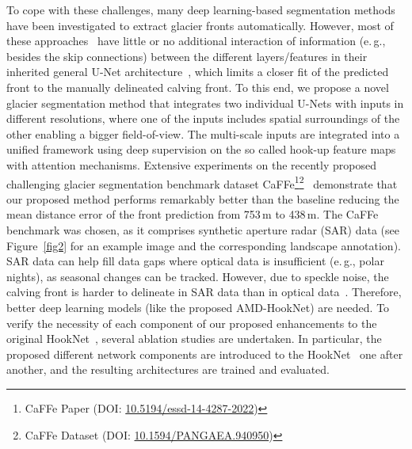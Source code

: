 \documentclass[lettersize,journal,siunitx]{IEEEtran}
\newcommand{\eg}{e.\,g.,\xspace}
\begin{document}
To cope with these challenges, many deep learning-based segmentation methods~\cite{baumhoer2019automated,zhang2019automatically,zhang2021automated,mohajerani2019detection,heidler2021hed,liu2021multiscale,periyasamy2022get,holzmann2021glacier,baumhoer2021environmental,dong2022automatic,marochov2021image,cheng2021calving,essd-14-4287-2022} have been investigated to extract glacier fronts automatically. However, most of these approaches~\cite{baumhoer2019automated,mohajerani2019detection, zhang2019automatically,liu2021multiscale,periyasamy2022get,holzmann2021glacier} have little or no additional interaction of information (\eg besides the skip connections) between the different layers/features in their inherited general U-Net architecture~\cite{ronneberger2015u}, which limits a closer fit of the predicted front to the manually delineated calving front. To this end, we propose a novel glacier segmentation method that integrates two individual U-Nets with inputs in different resolutions, where one of the inputs includes spatial surroundings of the other enabling a bigger field-of-view. The multi-scale inputs are integrated into a unified framework using deep supervision on the so called hook-up feature maps with attention mechanisms. Extensive experiments on the recently proposed challenging glacier segmentation benchmark dataset CaFFe\footnote{CaFFe Paper (DOI: \href{https://essd.copernicus.org/articles/14/4287/2022/}{10.5194/essd-14-4287-2022})}\footnote{CaFFe Dataset (DOI: \href{https://doi.org/10.1594/PANGAEA.940950}{10.1594/PANGAEA.940950})}~\cite{essd-14-4287-2022} demonstrate that our proposed method performs remarkably better than the baseline reducing the mean distance error of the front prediction from 753\,m to 438\,m. The CaFFe benchmark was chosen, as it comprises synthetic aperture radar (SAR) data (see Figure~\ref{fig2} for an example image and the corresponding landscape annotation). SAR data can help fill data gaps where optical data is insufficient (\eg polar nights), as seasonal changes can be tracked. However, due to speckle noise, the calving front is harder to delineate in SAR data than in optical data~\cite{baumhoer2018remote,tedesco2015remote}. Therefore, better deep learning models (like the proposed AMD-HookNet) are needed. To verify the necessity of each component of our proposed enhancements to the original HookNet~\cite{van2021hooknet}, several ablation studies are undertaken. In particular, the proposed different network components are introduced to the HookNet~\cite{van2021hooknet} one after another, and the resulting architectures are trained and evaluated.
\end{document}
